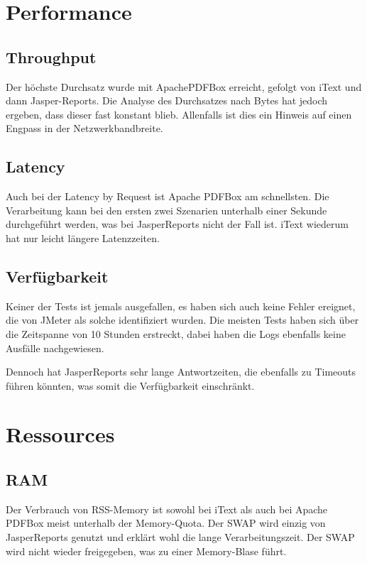 \documentclass[main.tex]{subfiles}
\begin{document}
\section{Performance}



\subsection{Throughput}

Der höchste Durchsatz wurde mit ApachePDFBox erreicht, gefolgt von iText und dann Jasper-Reports. Die Analyse des Durchsatzes nach Bytes hat jedoch ergeben, dass dieser fast konstant blieb. Allenfalls ist dies ein Hinweis auf einen Engpass in der Netzwerkbandbreite.

\subsection{Latency}
Auch bei der Latency by Request ist Apache PDFBox am schnellsten. Die Verarbeitung kann bei den ersten zwei Szenarien unterhalb einer Sekunde durchgeführt werden, was bei JasperReports nicht der Fall ist. iText wiederum hat nur leicht längere Latenzzeiten.

\subsection{Verfügbarkeit}

Keiner der Tests ist jemals ausgefallen, es haben sich auch keine Fehler ereignet, die von JMeter als solche identifiziert wurden. Die meisten Tests haben sich über die Zeitspanne von 10 Stunden erstreckt, dabei haben die Logs ebenfalls keine Ausfälle nachgewiesen.

Dennoch hat JasperReports sehr lange Antwortzeiten, die ebenfalls zu Timeouts führen könnten, was somit die Verfügbarkeit einschränkt.


\section{Ressources}

\subsection{RAM}
Der Verbrauch von RSS-Memory ist sowohl bei iText als auch bei Apache PDFBox meist unterhalb der Memory-Quota. Der SWAP wird einzig von JasperReports genutzt und erklärt wohl die lange Verarbeitungszeit. Der SWAP wird nicht wieder freigegeben, was zu einer Memory-Blase führt.
\end{document}
